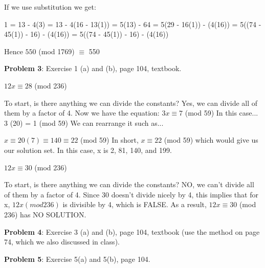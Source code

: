 \documentclass[12pt,letterpaper,final]{report}
\begin{document}
If we use substitution we get: \newline

1 = 13 - 4(3)  = 13 - 4(16 - 13(1))  = 5(13) - 64  = 5(29 - 16(1)) - (4(16))  = 5((74 - 45(1)) - 16) - (4(16))  = 5((74 - 45(1)) - 16) - (4(16)) \newline


Hence  $550$ (mod 1769) $\equiv$ 550 \newline

\bigskip
\noindent\textbf{Problem 3}: Exercise 1 (a) and (b), page 104, textbook.
\bigskip

$12x \equiv 28$ (mod 236) \newline

To start, is there anything we can divide the constants? Yes, we can divide all of them by a factor of 4. 
\bigskip\newline Now we have the equation: \indent $3x \equiv 7$ (mod 59) 
\bigskip\newline 
In this case... 3 (20) = 1 (mod 59)
We can rearrange it such as...

\indent $x \equiv 20 (7) \equiv 140 \equiv 22$ (mod 59)
\bigskip\newline 
In short, $x \equiv 22$ (mod 59) which would give us our solution set. \newline
In this case, x is 2, 81, 140, and 199.
\bigskip

$12x \equiv 30$ (mod 236) \newline

To start, is there anything we can divide the constants? NO, we can't divide all of them by a factor of 4. \bigskip\newline
Since 30  doesn't divide nicely by 4, this implies that for x, $12x (mod 236)$ is divisible by 4, which is FALSE. 
 \bigskip\newline
As a result, $12x \equiv 30$ (mod 236) has NO SOLUTION.



\bigskip
\noindent\textbf{Problem 4}: Exercise 3 (a) and (b), page 104, textbook (use the method on page 74, which we also discussed in class).


\bigskip
\noindent\textbf{Problem 5}: Exercise 5(a) and 5(b), page 104.
\end{document}

